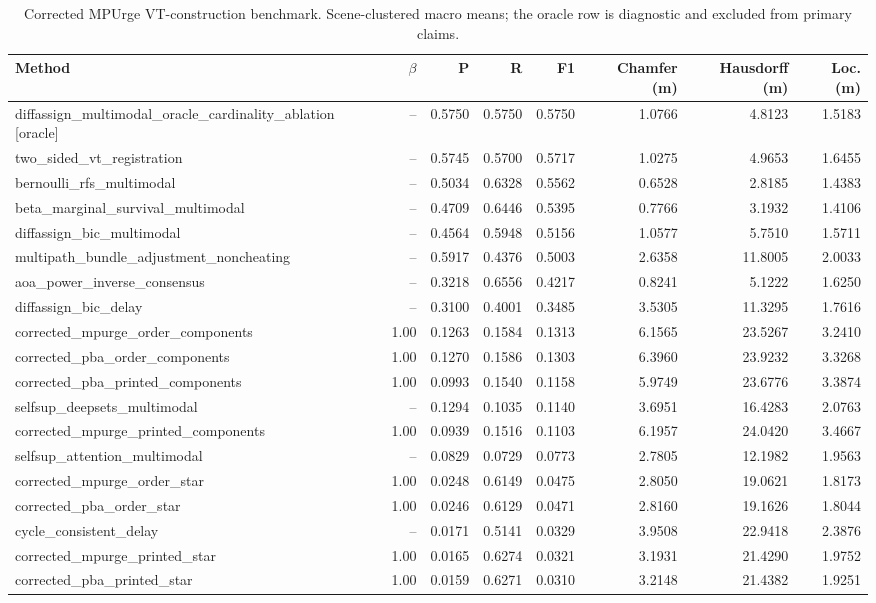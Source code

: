 \begin{table}[t]
\centering
\small
\caption{Corrected MPUrge VT-construction benchmark. Scene-clustered macro means; the oracle row is diagnostic and excluded from primary claims.}
\label{tab:corrected-mpurge-vt-full}
\begin{tabular}{lrrrrrrr}
\toprule
Method & $\beta$ & P & R & F1 & Chamfer (m) & Hausdorff (m) & Loc. (m) \\
\midrule
diffassign\_multimodal\_oracle\_cardinality\_ablation [oracle] & -- & 0.5750 & 0.5750 & 0.5750 & 1.0766 & 4.8123 & 1.5183 \\
two\_sided\_vt\_registration & -- & 0.5745 & 0.5700 & 0.5717 & 1.0275 & 4.9653 & 1.6455 \\
bernoulli\_rfs\_multimodal & -- & 0.5034 & 0.6328 & 0.5562 & 0.6528 & 2.8185 & 1.4383 \\
beta\_marginal\_survival\_multimodal & -- & 0.4709 & 0.6446 & 0.5395 & 0.7766 & 3.1932 & 1.4106 \\
diffassign\_bic\_multimodal & -- & 0.4564 & 0.5948 & 0.5156 & 1.0577 & 5.7510 & 1.5711 \\
multipath\_bundle\_adjustment\_noncheating & -- & 0.5917 & 0.4376 & 0.5003 & 2.6358 & 11.8005 & 2.0033 \\
aoa\_power\_inverse\_consensus & -- & 0.3218 & 0.6556 & 0.4217 & 0.8241 & 5.1222 & 1.6250 \\
diffassign\_bic\_delay & -- & 0.3100 & 0.4001 & 0.3485 & 3.5305 & 11.3295 & 1.7616 \\
corrected\_mpurge\_order\_components & 1.00 & 0.1263 & 0.1584 & 0.1313 & 6.1565 & 23.5267 & 3.2410 \\
corrected\_pba\_order\_components & 1.00 & 0.1270 & 0.1586 & 0.1303 & 6.3960 & 23.9232 & 3.3268 \\
corrected\_pba\_printed\_components & 1.00 & 0.0993 & 0.1540 & 0.1158 & 5.9749 & 23.6776 & 3.3874 \\
selfsup\_deepsets\_multimodal & -- & 0.1294 & 0.1035 & 0.1140 & 3.6951 & 16.4283 & 2.0763 \\
corrected\_mpurge\_printed\_components & 1.00 & 0.0939 & 0.1516 & 0.1103 & 6.1957 & 24.0420 & 3.4667 \\
selfsup\_attention\_multimodal & -- & 0.0829 & 0.0729 & 0.0773 & 2.7805 & 12.1982 & 1.9563 \\
corrected\_mpurge\_order\_star & 1.00 & 0.0248 & 0.6149 & 0.0475 & 2.8050 & 19.0621 & 1.8173 \\
corrected\_pba\_order\_star & 1.00 & 0.0246 & 0.6129 & 0.0471 & 2.8160 & 19.1626 & 1.8044 \\
cycle\_consistent\_delay & -- & 0.0171 & 0.5141 & 0.0329 & 3.9508 & 22.9418 & 2.3876 \\
corrected\_mpurge\_printed\_star & 1.00 & 0.0165 & 0.6274 & 0.0321 & 3.1931 & 21.4290 & 1.9752 \\
corrected\_pba\_printed\_star & 1.00 & 0.0159 & 0.6271 & 0.0310 & 3.2148 & 21.4382 & 1.9251 \\
\bottomrule
\end{tabular}
\end{table}
